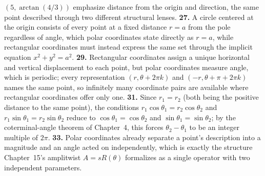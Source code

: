$(5,\arctan(4/3))$ emphasize distance from the origin and direction, the
same point described through two different structural lenses. \quad
\textbf{27.} A circle centered at the origin consists of every point at a
fixed distance $r=a$ from the pole regardless of angle, which polar
coordinates state directly as $r=a$, while rectangular coordinates must
instead express the same set through the implicit equation
$x^2+y^2=a^2$. \quad
\textbf{29.} Rectangular coordinates assign a unique horizontal and
vertical displacement to each point, but polar coordinates measure angle,
which is periodic; every representation $(r,\theta+2\pi k)$ and
$(-r,\theta+\pi+2\pi k)$ names the same point, so infinitely many
coordinate pairs are available where rectangular coordinates offer only
one. \quad
\textbf{31.} Since $r_1=r_2$ (both being the positive distance to the
same point), the conditions $r_1\cos\theta_1=r_2\cos\theta_2$ and
$r_1\sin\theta_1=r_2\sin\theta_2$ reduce to $\cos\theta_1=\cos\theta_2$
and $\sin\theta_1=\sin\theta_2$; by the coterminal-angle theorem of
Chapter~4, this forces $\theta_2-\theta_1$ to be an integer multiple of
$2\pi$. \quad
\textbf{33.} Polar coordinates already separate a point's description
into a magnitude and an angle acted on independently, which is exactly
the structure Chapter~15's amplitwist $A=sR(\theta)$ formalizes as a
single operator with two independent parameters.

